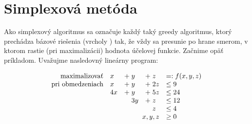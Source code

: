 \section{Simplexová metóda}
\renewcommand{\common}{
      \draw[dashed]
        (0,0,0) -- (6,0,0)
        (0,0,0) -- (0,4,0)
        (0,0,0) -- (0,0,4);
    
    \draw
      (1,0,4) -- (5,4,0) -- (0,3,3) -- (0,1,4) -- (1,0,4) -- (0,0,4) -- (0,1,4)
      (1,0,4) -- (6,0,0) -- (5,4,0) -- (0,4,0) -- (0,3,3);


}

\newcommand{\tmpSimplexNode}[2]{
  (#1) circle (1.2pt) node[anchor=#2] {\footnotesize $(#1)$}
}

\noindent
Ako simplexový algoritmus sa označuje každý taký greedy algoritmus, ktorý 
prechádza bázové riešenia (vrcholy \dom) tak, že vždy sa presunie po hrane smerom, v ktorom
rastie (pri maximalizácii) hodnota účelovej funkcie. 
Začnime opäť príkladom. Uvažujme nasledovný lineárny program:

\begin{equation}
  \label{simplex:eq:1}
  \begin{array}{rllll}
    \text{maximalizovať}& x & +\;y & +\;z & =:  f(x,y,z)\\
  \text{pri obmedzeniach}& x & +\;y & +\;2z & \le 9\\
                         & 4x & +\;y&+\;5z&\le 24\\
                         &    &\phantom{+}\;3y&+\;z&\le 12\\
                         &    &     &\phantom{+}\;z&\le 4\\
\multicolumn{4}{r}{x,y,z}&\ge 0
 

  \end{array}
\end{equation}


